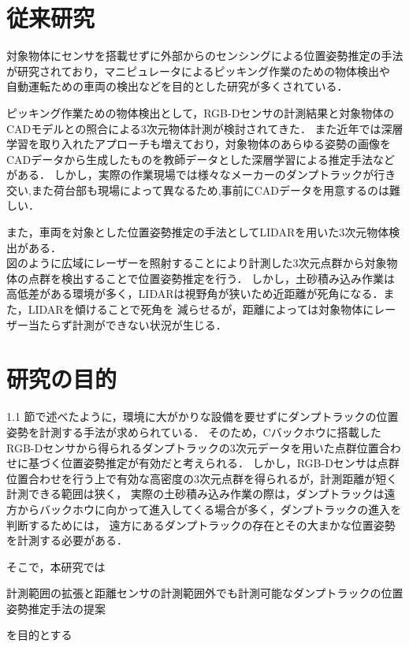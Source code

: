 \newpage

\section{従来研究}
対象物体にセンサを搭載せずに外部からのセンシングによる位置姿勢推定の手法が研究されており，マニピュレータによるピッキング作業のための物体検出や
自動運転ための車両の検出などを目的とした研究が多くされている．

ピッキング作業ための物体検出として，RGB-Dセンサの計測結果と対象物体のCADモデルとの照合による3次元物体計測が検討されてきた．\cite{中原智治2001}\cite{林2008}\cite{西卓郎2014}
また近年では深層学習を取り入れたアプローチも増えており，対象物体のあらゆる姿勢の画像をCADデータから生成したものを教師データとした深層学習による推定手法\cite{Sundermeyer2018}\cite{Tremblay2018}などがある．
しかし，実際の作業現場では様々なメーカーのダンプトラックが行き交い,また荷台部も現場によって異なるため,事前にCADデータを用意するのは難しい．

また，車両を対象とした位置姿勢推定の手法としてLIDARを用いた3次元物体検出がある．\cite{Zhang2017}\cite{Chen2017}\cite{Lang2019}\\
図のように広域にレーザーを照射することにより計測した3次元点群から対象物体の点群を検出することで位置姿勢推定を行う．
しかし，土砂積み込み作業は高低差がある環境が多く，LIDARは視野角が狭いため近距離が死角になる．また，LIDARを傾けることで死角を
減らせるが，距離によっては対象物体にレーザー当たらず計測ができない状況が生じる．

\newpage
\section{研究の目的}
1.1 節で述べたように，環境に大がかりな設備を要せずにダンプトラックの位置姿勢を計測する手法が求められている．
そのため，Cバックホウに搭載したRGB-Dセンサから得られるダンプトラックの3次元データを用いた点群位置合わせに基づく位置姿勢推定が有効だと考えられる．
しかし，RGB-Dセンサは点群位置合わせを行う上で有効な高密度の3次元点群を得られるが，計測距離が短く計測できる範囲は狭く，
実際の土砂積み込み作業の際は，ダンプトラックは遠方からバックホウに向かって進入してくる場合が多く，ダンプトラックの進入を判断するためには，
遠方にあるダンプトラックの存在とその大まかな位置姿勢を計測する必要がある．



\par
そこで，本研究では
    \begin{screen}
        \begin{center}
        計測範囲の拡張と距離センサの計測範囲外でも計測可能なダンプトラックの位置姿勢推定手法の提案
        \end{center}
    \end{screen}
を目的とする
\newpage
